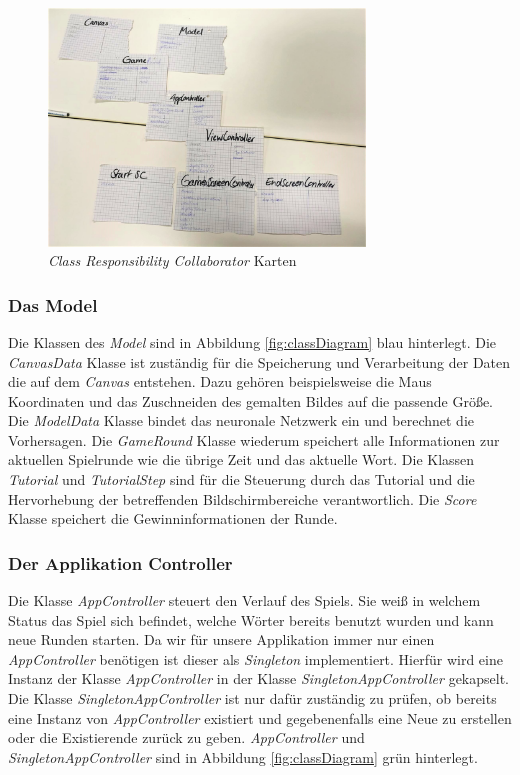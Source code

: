 \documentclass[11pt]{article}
\begin{document}
\begin{figure}[ht]
\centering
\includegraphics[width=0.75\textwidth]{images/crc.png}
\caption{\label{fig:crcCard}\textit{Class Responsibility Collaborator} Karten}
\end{figure}

\subsubsection{Das Model}
Die Klassen des \textit{Model} sind in Abbildung \ref{fig:classDiagram} blau hinterlegt. Die \textit{CanvasData} Klasse ist zuständig für die Speicherung und Verarbeitung der Daten die auf dem \textit{Canvas} entstehen. Dazu gehören beispielsweise die Maus Koordinaten und das Zuschneiden des gemalten Bildes auf die passende Größe. Die \textit{ModelData} Klasse bindet das neuronale Netzwerk ein und berechnet die Vorhersagen. Die \textit{GameRound} Klasse wiederum speichert alle Informationen zur aktuellen Spielrunde wie die übrige Zeit und das aktuelle Wort. Die Klassen \textit{Tutorial} und \textit{TutorialStep} sind für die Steuerung durch das Tutorial und die Hervorhebung der betreffenden Bildschirmbereiche verantwortlich. Die \textit{Score} Klasse speichert die Gewinninformationen der Runde.

\subsubsection{Der Applikation Controller}
Die Klasse \textit{AppController} steuert den Verlauf des Spiels. Sie weiß in welchem Status das Spiel sich befindet, welche Wörter bereits benutzt wurden und kann neue Runden starten. Da wir für unsere Applikation immer nur einen \textit{AppController} benötigen ist dieser als \textit{Singleton} implementiert. Hierfür wird eine Instanz der Klasse \textit{AppController} in der Klasse \textit{SingletonAppController} gekapselt. Die Klasse \textit{SingletonAppController} ist nur dafür zuständig zu prüfen, ob bereits eine Instanz von \textit{AppController} existiert und gegebenenfalls eine Neue zu erstellen oder die Existierende zurück zu geben. \textit{AppController} und \textit{SingletonAppController} sind in Abbildung \ref{fig:classDiagram} grün hinterlegt.
\end{document}
